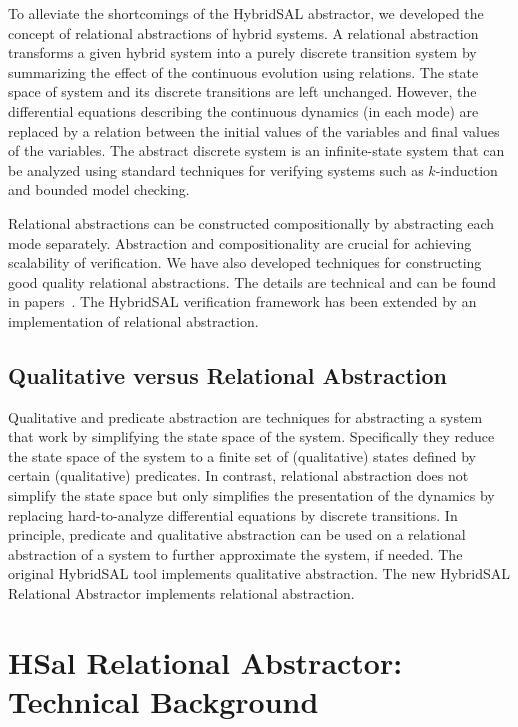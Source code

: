 \documentclass{article}
\begin{document}
To alleviate the shortcomings of the HybridSAL abstractor,
we developed the concept of relational abstractions of hybrid
systems.  A relational abstraction transforms a given hybrid system into
a purely discrete transition system by summarizing the effect
of the continuous evolution using relations.   The state space
of system and its discrete transitions are left unchanged. 
However, the differential equations describing the
continuous dynamics (in each mode) are replaced by a 
relation between the initial values of the variables and 
final values of the variables.
The abstract discrete system is an infinite-state system that can be
analyzed using standard techniques for verifying systems such
as $k$-induction and bounded model checking.

Relational abstractions can be constructed compositionally by 
abstracting each mode separately.  Abstraction and compositionality
are crucial for achieving scalability of verification.
We have also developed techniques for constructing good quality 
relational abstractions.  The details are technical and can be 
found in papers~\cite{ST11:CAV,Tiwari03:HSCC}.  The HybridSAL verification framework has 
been extended by an implementation of relational abstraction.


\subsection{Qualitative versus Relational Abstraction}

Qualitative and predicate abstraction are techniques for abstracting
a system that work by simplifying the state space of the system.
Specifically they reduce the state space of the system to a finite
set of (qualitative) states defined by certain (qualitative) predicates.
In contrast, relational abstraction does not simplify the state space
but only simplifies the presentation of the dynamics by replacing
hard-to-analyze differential equations by discrete transitions.
In principle, predicate and qualitative abstraction can be used on
a relational abstraction of a system to further approximate the
system, if needed.  The original HybridSAL tool implements qualitative
abstraction.  The new HybridSAL Relational Abstractor implements
relational abstraction. 


\section{HSal Relational Abstractor: Technical Background}
\end{document}
